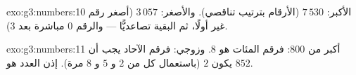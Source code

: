 \begin{solution}{exo:g3:numbers:10}
الأكبر: $7\,530$ (الأرقام بترتيب تناقصي). والأصغر: $3\,057$
(أصغر رقم غير  أولًا، ثم البقية تصاعديًّا --- والرقم $0$
مباشرة بعد $3$).
\end{solution}

\begin{solution}{exo:g3:numbers:11}
أكبر من $800$: فرقم المئات هو $8$. وزوجي: فرقم الآحاد
يجب أن يكون $2$ (باستعمال كل من $2$ و $5$ و $8$ مرة). إذن العدد هو
$852$.
\end{solution}
